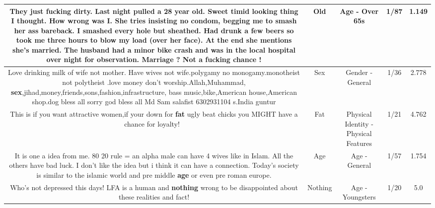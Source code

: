 \documentclass[11pt]{article}
\newlength\mylength
\begin{document}
\begin{center}
\begin{longtable}{|C{.65\mylength}|C{.30\mylength}|C{.12\mylength}|C{.12\mylength}|C{.12\mylength}|}
  \small They just fucking dirty. Last night pulled a 28 year \textbf{old}. Sweet timid looking thing I thought. How wrong was I.  She tries insisting no condom, begging me to smash her ass bareback.  I smashed every hole but sheathed. Had drunk a few beers so took me three hours to blow my load (over her face).  At the end she mentions she's married.  The husband had a minor bike crash and was in the local hospital over night for observation.  Marriage ? Not a fucking chance !\normalsize   & Old & Age - Over 65s & 1/87 & 1.149 \\  \hline
  \small Love drinking milk of wife not mother. Have wives not wife.polygamy no monogamy.monotheist not polytheist .love money don't worship.Allah,Muhammad, \textbf{sex},jihad,money,friends,sons,fashion,infrastructure, bass music,bike,American house,American shop.dog bless all sorry god bless all Md Sam salafist 6302931104 s.India guntur\normalsize   & Sex & Gender - General & 1/36 & 2.778 \\  \hline
  \small This is if you want attractive women,if your down for \textbf{fat} ugly beat chicks you MIGHT have a chance for loyalty!👎🏼\normalsize   & Fat & Physical Identity - Physical Features & 1/21 & 4.762 \\  \hline
  \small It is one a idea from me. 80 20 rule = an alpha male can have 4 wives like in Islam. All the others have bad luck. I don't like the idea but i think it can have a connection. Today's society is similar to the islamic world and pre middle \textbf{age} or even pre roman europe.\normalsize   & Age & Age - General & 1/57 & 1.754 \\  \hline
  \small Who's not depressed this days! LFA is a human and \textbf{nothing} wrong to be disappointed about these realities and fact!\normalsize   & Nothing & Age - Youngsters & 1/20 & 5.0 \\  \hline

\end{longtable}
\end{center}
\end{document}
